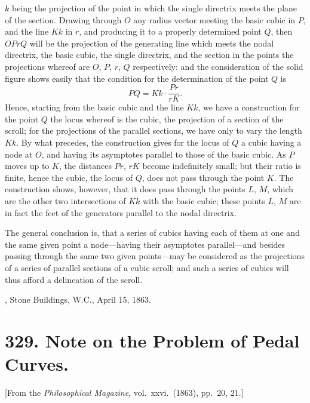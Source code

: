 \documentclass[11pt,a4paper]{article}
\theoremstyle{plain}
\begin{document}
$k$ being the projection of the point in which the single directrix meets the plane of the section. Drawing through $O$ any radius vector meeting the basic cubic in $P$, and the line $Kk$ in $r$, and producing it to a properly determined point $Q$, then $OPrQ$ will be the projection of the generating line which meets the nodal directrix, the basic cubic, the single directrix, and the section in the points the projections whereof are $O$, $P$, $r$, $Q$ respectively: and the consideration of the solid figure shows easily that the condition for the determination of the point $Q$ is
\[
PQ = Kk\cdot\frac{Pr}{rK}.
\]
\newpage
Hence, starting from the basic cubic and the line $Kk$, we have a construction for the point $Q$ the locus whereof is the cubic, the projection of a section of the scroll; for the projections of the parallel sections, we have only to vary the length $Kk$. By what precedes, the construction gives for the locus of $Q$ a cubic having a node at $O$, and having its asymptotes parallel to those of the basic cubic. As $P$ moves up to $K$, the distances $Pr$, $rK$ become indefinitely small; but their ratio is finite, hence the cubic, the locus of $Q$, does not pass through the point $K$. The construction shows, however, that it does pass through the points $L$, $M$, which are the other two intersections of $Kk$ with the basic cubic; these points $L$, $M$ are in fact the feet of the generators parallel to the nodal directrix.

The general conclusion is, that a series of cubics having each of them at one and the same given point a node---having their asymptotes parallel---and besides passing through the same two given points---may be considered as the projections of a series of parallel sections of a cubic scroll; and such a series of cubics will thus afford a delineation of the scroll.

\medskip
{}, Stone Buildings, W.C., April 15, 1863.


\newpage
\section*{329. Note on the Problem of Pedal Curves.}

[From the \textit{Philosophical Magazine}, vol.\ xxvi.\ (1863), pp.\ 20, 21.]
\end{document}
